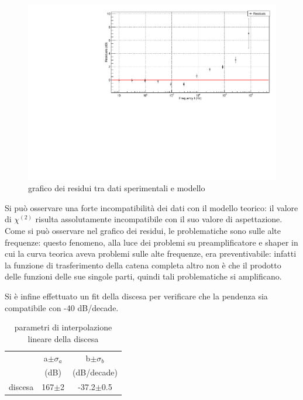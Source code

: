 \documentclass{article}
\begin{document}
\begin{center}
\begin{figure}[H]
\centering
\includegraphics[scale=0.4, angle=0]{bodecatenaresidui.pdf}
\caption{grafico dei residui tra dati sperimentali e modello}
\label{fig:catenaQvsV_res}
\end{figure}
\end{center}

Si può osservare una forte incompatibilità dei dati con il modello teorico: il valore
di $\chi^{(2)}$ risulta assolutamente incompatibile con il suo valore di aspettazione.
Come si può osservare nel grafico dei residui, le problematiche sono sulle alte frequenze:
questo fenomeno, alla luce dei problemi su preamplificatore e shaper in cui la curva teorica
aveva problemi sulle alte frequenze, era preventivabile: infatti la funzione di trasferimento
della catena completa altro non è che il prodotto delle funzioni delle sue singole parti, quindi 
tali problematiche si amplificano.

Si è infine effettuato un fit della discesa per verificare che la pendenza sia compatibile con -40 dB/decade.

\begin{table}[ht]
    \centering
    \begin{tabular}{rcccc}
        \toprule
                &\multicolumn{2}{c}{a$\pm \sigma_a$} &\multicolumn{2}{c}{b$\pm \sigma_b$}\\
                &\multicolumn{2}{c}{(dB)}  &\multicolumn{2}{c}{(dB/decade)}\\
        \midrule
        discesa &\multicolumn{2}{c}{167$\pm$2}&\multicolumn{2}{c}{-37.2$\pm$0.5}\\
        \bottomrule
    \end{tabular}
    \caption{parametri di interpolazione lineare della discesa}
\end{table}
\end{document}
